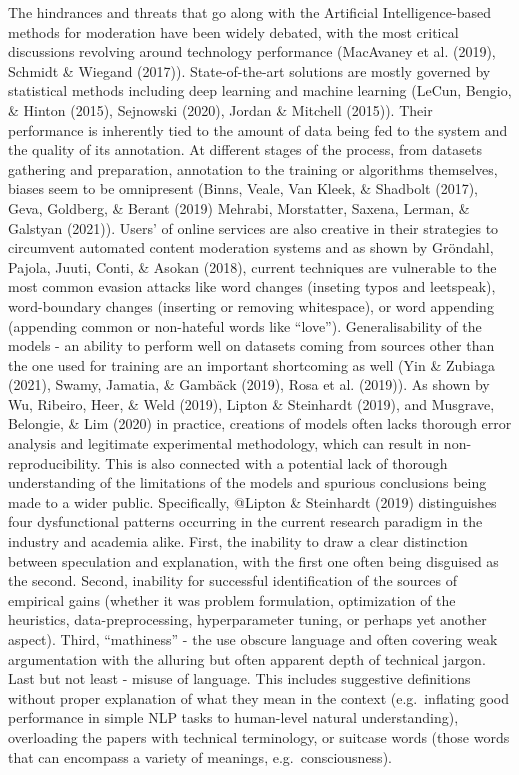 \documentclass[
  10pt,
  dvipsnames,enabledeprecatedfontcommands]{scrartcl}
\begin{document}
The hindrances and threats that go along with the Artificial
Intelligence-based methods for moderation have been widely debated, with
the most critical discussions revolving around technology performance
(MacAvaney et al. (2019), Schmidt \& Wiegand (2017)). State-of-the-art
solutions are mostly governed by statistical methods including deep
learning and machine learning (LeCun, Bengio, \& Hinton (2015),
Sejnowski (2020), Jordan \& Mitchell (2015)). Their performance is
inherently tied to the amount of data being fed to the system and the
quality of its annotation. At different stages of the process, from
datasets gathering and preparation, annotation to the training or
algorithms themselves, biases seem to be omnipresent (Binns, Veale, Van
Kleek, \& Shadbolt (2017), Geva, Goldberg, \& Berant (2019) Mehrabi,
Morstatter, Saxena, Lerman, \& Galstyan (2021)). Users' of online
services are also creative in their strategies to circumvent automated
content moderation systems and as shown by Gröndahl, Pajola, Juuti,
Conti, \& Asokan (2018), current techniques are vulnerable to the most
common evasion attacks like word changes (inseting typos and leetspeak),
word-boundary changes (inserting or removing whitespace), or word
appending (appending common or non-hateful words like ``love'').
Generalisability of the models - an ability to perform well on datasets
coming from sources other than the one used for training are an
important shortcoming as well (Yin \& Zubiaga (2021), Swamy, Jamatia, \&
Gambäck (2019), Rosa et al. (2019)). As shown by Wu, Ribeiro, Heer, \&
Weld (2019), Lipton \& Steinhardt (2019), and Musgrave, Belongie, \& Lim
(2020) in practice, creations of models often lacks thorough error
analysis and legitimate experimental methodology, which can result in
non-reproducibility. This is also connected with a potential lack of
thorough understanding of the limitations of the models and spurious
conclusions being made to a wider public. Specifically, @Lipton \&
Steinhardt (2019) distinguishes four dysfunctional patterns occurring in
the current research paradigm in the industry and academia alike. First,
the inability to draw a clear distinction between speculation and
explanation, with the first one often being disguised as the second.
Second, inability for successful identification of the sources of
empirical gains (whether it was problem formulation, optimization of the
heuristics, data-preprocessing, hyperparameter tuning, or perhaps yet
another aspect). Third, ``mathiness'' - the use obscure language and
often covering weak argumentation with the alluring but often apparent
depth of technical jargon. Last but not least - misuse of language. This
includes suggestive definitions without proper explanation of what they
mean in the context (e.g.~inflating good performance in simple NLP tasks
to human-level natural understanding), overloading the papers with
technical terminology, or suitcase words (those words that can encompass
a variety of meanings, e.g.~consciousness).
\end{document}
